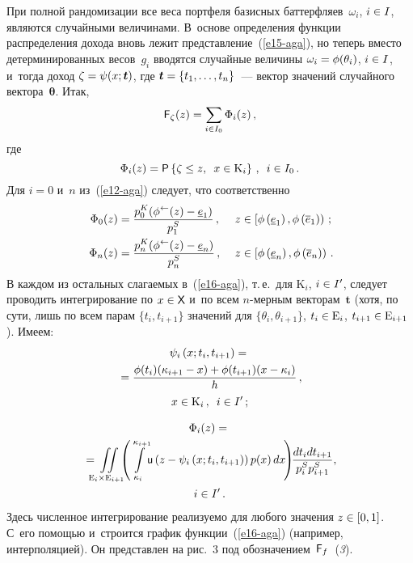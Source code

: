 \begin{multicols}{2}
  При полной рандомизации все веса портфеля базисных 
баттерфляев~$\omega_i$, $i\hm\in I$, являются случайными величинами. 
В~основе определения функции распределения дохода вновь лежит 
пред\-став\-ле\-ние~(\ref{e15-aga}), но теперь вместо детерминированных 
весов~$g_i$ вводятся случайные величины $\omega_i\hm= \phi(\theta_i)$, 
$i\hm\in I$, и~тогда доход $\zeta\hm= \psi(x; \boldsymbol{t})$, где 
$\boldsymbol{t}\hm= \{ t_1, \ldots , t_n\}$~--- вектор значений случайного 
вектора~$\boldsymbol{\theta}$. Итак, 
  \begin{equation}
  {\sf F}_\zeta(z)=\sum\limits_{i\in I_0} \Phi_i(z)\,,
    \label{e16-aga}
    \end{equation}
    где
    $$
  \Phi_i(z)={\sf P}\left\{ \zeta\leq z,\enskip x\in \mathrm{K}_i\right\}\,,\enskip i\in I_0\,.
$$
  Для $i = 0$ и~$n$ из~(\ref{e12-aga}) следует, что соответственно 
  \begin{alignat}{2}
  \Phi_0(z) &= \fr{p_0^K (\phi^\leftarrow (z)-\underline{e}_1)}{p_1^S}\,,&\  
z&\in \left[ \phi\left( \underline{e}_1\right), \phi\left( 
\overline{e}_1\right)\right)\,;\label{e17-aga}\\
  \Phi_n(z) &= \fr{p_n^K (\phi^\leftarrow (z)-\underline{e}_n)}{p_n^S}\,,&\ 
z&\in \left[ \phi\left( \underline{e}_n\right), \phi\left( 
\overline{e}_n\right)\right)\,.\!\!
\label{e17-aga-1}
\end{alignat}
  В каждом из остальных слагаемых в~(\ref{e16-aga}), т.\,е.\ для 
$\mathrm{K}_i$, $i\hm\in I^\prime$, следует проводить интегрирование по 
$x\hm\in{\sf X}$ и~по всем $n$-мер\-ным векторам~$\boldsymbol{t}$ (хотя, по 
сути, лишь по всем парам $\{t_i, t_{i+1}\}$ значений для $\{\theta_i, \theta_{i+1}\}$, 
$t_i\hm\in \mathrm{E}_i$, $t_{i+1}\hm\in \mathrm{E}_{i+1}$). Имеем: 
  \begin{multline}
  \psi_i\left(x; t_i,t_{i+1}\right)= {}\\
  {}=\displaystyle\frac{\displaystyle \phi(t_i)(\kappa_{i+1}-x) +\phi(t_{i+1}) (x-
\kappa_i)\mathstrut}{\displaystyle h\mathstrut}\,,\\
x\in \mathrm{K}_i\,,\enskip 
i\in I^\prime\,;
\end{multline}

\vspace*{-12pt}

\noindent
\begin{multline}
  \Phi_i(z)={}\\
  {}=\!\! \iint\limits_{\mathrm{E}_i\times \mathrm{E}_{i+1}}\!\!\! \left(
\int\limits_{\,\kappa_i}^{\kappa_{i+1}}\!\! {\sf u}\left( z-
\psi_i\left(x;t_i,t_{i+1}\right)\right) p(x)\,dx \!\right)\!\! \fr{dt_i dt_{i+1}}{p_i^S 
p_{i+1}^S},\\
i\in I^\prime\,.
  \label{e18-aga}
  \end{multline}
  Здесь численное интегрирование реализуемо для любого значения $z\hm\in 
[0, 1]$. С~его помощью и~строится график функции~(\ref{e16-aga}) (например, 
интерполяцией). Он представлен на рис.~3 под обозначением~${\sf F}_f$~(\textit{3}). 
  

\end{multicols}
